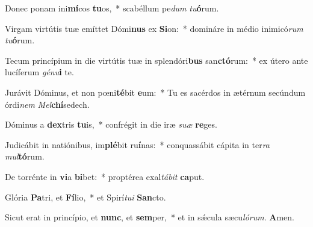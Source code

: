 ﻿\item Donec ponam ini\textbf{mí}cos \textbf{tu}os,~* scabéllum pe\textit{dum} \textit{tu}\textbf{ó}rum.

\item Virgam virtútis tuæ emíttet Dómi\textbf{nus} ex \textbf{Si}on:~* domináre in médio inimicó\textit{rum} \textit{tu}\textbf{ó}rum.

\item Tecum princípium in die virtútis tuæ in splendóri\textbf{bus} san\textbf{ctó}rum:~* ex útero ante lucíferum \textit{gé}\textit{nu}\textbf{i} te.

\item Jurávit Dóminus, et non pœni\textbf{té}bit \textbf{e}um:~* Tu es sacérdos in ætérnum secúndum órdi\textit{nem} \textit{Mel}\textbf{chí}sedech.

\item Dóminus a \textbf{dex}tris \textbf{tu}is,~* confrégit in die iræ \textit{su}\textit{æ} \textbf{re}ges.

\item Judicábit in natiónibus, im\textbf{plé}bit ru\textbf{í}nas:~* conquassábit cápita in ter\textit{ra} \textit{mul}\textbf{tó}rum.

\item De torrénte in \textbf{vi}a \textbf{bi}bet:~* proptérea exal\textit{tá}\textit{bit} \textbf{ca}put.

\item Glória \textbf{Pa}tri, et \textbf{Fí}lio,~* et Spirí\textit{tu}\textit{i} \textbf{San}cto.

\item Sicut erat in princípio, et \textbf{nunc}, et \textbf{sem}per,~* et in sǽcula sæcu\textit{ló}\textit{rum}. \textbf{A}men.